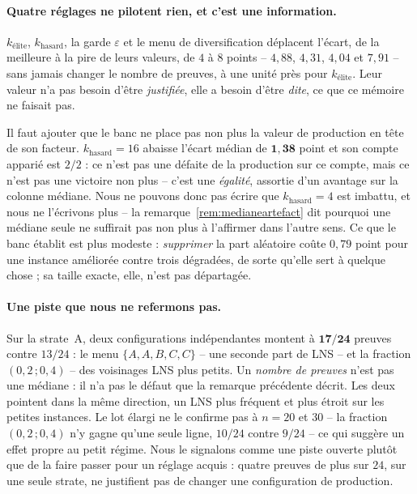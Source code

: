 \documentclass[11pt,a4paper]{article}
\theoremstyle{plain}
\theoremstyle{remark}
\begin{document}
\paragraph{Quatre réglages ne pilotent rien, et c'est une information.}
$k_{\text{élite}}$, $k_{\text{hasard}}$, la garde $\varepsilon$ et le menu
de diversification déplacent l'écart, de la meilleure à la pire de leurs
valeurs, de $4$ à $8$ points -- $4{,}88$, $4{,}31$, $4{,}04$ et $7{,}91$ --
sans jamais changer le nombre de preuves, à une unité près pour
$k_{\text{élite}}$. Leur valeur n'a pas besoin d'être \emph{justifiée},
elle a besoin d'être \emph{dite}, ce que ce mémoire ne faisait pas.

Il faut ajouter que le banc ne place pas non plus la valeur de production
en tête de son facteur. $k_{\text{hasard}}=16$ abaisse l'écart médian de
$\mathbf{1{,}38}$ point et son compte apparié est $2/2$ : ce n'est pas une
défaite de la production sur ce compte, mais ce n'est pas une victoire non
plus -- c'est une \emph{égalité}, assortie d'un avantage sur la colonne
médiane. Nous ne pouvons donc pas écrire que $k_{\text{hasard}}=4$ est
imbattu, et nous ne l'écrivons plus -- la remarque~\ref{rem:medianeartefact}
dit pourquoi une médiane seule ne suffirait pas non plus à l'affirmer dans
l'autre sens. Ce que le banc établit est plus
modeste : \emph{supprimer} la part aléatoire coûte $0{,}79$ point pour une
instance améliorée contre trois dégradées, de sorte qu'elle sert à quelque
chose ; sa taille exacte, elle, n'est pas départagée.

\paragraph{Une piste que nous ne refermons pas.} Sur la strate~A, deux
configurations indépendantes montent à $\mathbf{17/24}$ preuves contre
$13/24$ : le menu $\{A,A,B,C,C\}$ -- une seconde part de LNS -- et la
fraction $(0{,}2\,;0{,}4)$ -- des voisinages LNS plus petits. Un
\emph{nombre de preuves} n'est pas une médiane : il n'a pas le défaut que la
remarque précédente décrit. Les deux pointent dans la même direction, un LNS
plus fréquent et plus étroit sur les petites instances. Le lot élargi ne le
confirme pas à $n=20$ et $30$ -- la fraction $(0{,}2\,;0{,}4)$ n'y gagne
qu'une seule ligne, $10/24$ contre $9/24$ -- ce qui suggère un effet propre
au petit régime. Nous le signalons comme une piste ouverte plutôt que
de la faire passer pour un réglage acquis : quatre preuves de plus sur $24$,
sur une seule strate, ne justifient pas de changer une configuration de
production.
\end{document}
